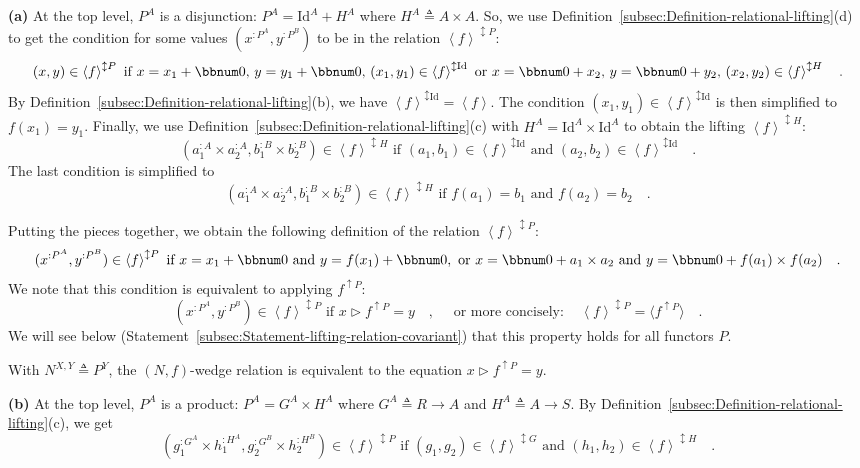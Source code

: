 \textbf{(a)} At the top level, $P^{A}$ is a disjunction: $P^{A}=\text{Id}^{A}+H^{A}$
where $H^{A}\triangleq A\times A$. So, we use Definition~\ref{subsec:Definition-relational-lifting}(d)
to get the condition for some values $(x^{:P^{A}},y^{:P^{B}})$ to
be in the relation $\left<f\right>^{\updownarrow P}$:
\[
(x,y)\in\left<f\right>^{\updownarrow P}\text{ if }x=x_{1}+\bbnum 0,\,y=y_{1}+\bbnum 0,\,(x_{1},y_{1})\in\left<f\right>^{\updownarrow\text{Id}}\text{ or }x=\bbnum 0+x_{2},\,y=\bbnum 0+y_{2},\,(x_{2},y_{2})\in\left<f\right>^{\updownarrow H}\quad.
\]
By Definition~\ref{subsec:Definition-relational-lifting}(b), we
have $\left<f\right>^{\updownarrow\text{Id}}=\left<f\right>$. The
condition $(x_{1},y_{1})\in\left<f\right>^{\updownarrow\text{Id}}$
is then simplified to $f(x_{1})=y_{1}$. Finally, we use Definition~\ref{subsec:Definition-relational-lifting}(c)
with $H^{A}=\text{Id}^{A}\times\text{Id}^{A}$ to obtain the lifting
$\left<f\right>^{\updownarrow H}$:
\[
(a_{1}^{:A}\times a_{2}^{:A},b_{1}^{:B}\times b_{2}^{:B})\in\left<f\right>^{\updownarrow H}\text{ if }(a_{1},b_{1})\in\left<f\right>^{\updownarrow\text{Id}}\text{ and }(a_{2},b_{2})\in\left<f\right>^{\updownarrow\text{Id}}\quad.
\]
The last condition is simplified to
\[
(a_{1}^{:A}\times a_{2}^{:A},b_{1}^{:B}\times b_{2}^{:B})\in\left<f\right>^{\updownarrow H}\text{ if }f(a_{1})=b_{1}\text{ and }f(a_{2})=b_{2}\quad.
\]

Putting the pieces together, we obtain the following definition of
the relation $\left<f\right>^{\updownarrow P}$:
\[
(x^{:P^{A}},y^{:P^{B}})\in\left<f\right>^{\updownarrow P}\text{ if }x=x_{1}+\bbnum 0\text{ and }y=f(x_{1})+\bbnum 0,\text{ or }x=\bbnum 0+a_{1}\times a_{2}\text{ and }y=\bbnum 0+f(a_{1})\times f(a_{2})\quad.
\]
We note that this condition is equivalent to applying $f^{\uparrow P}$:
\[
(x^{:P^{A}},y^{:P^{B}})\in\left<f\right>^{\updownarrow P}\text{ if }x\triangleright f^{\uparrow P}=y\quad,\quad\text{ or more concisely}:\quad\left<f\right>^{\updownarrow P}=\langle f^{\uparrow P}\rangle\quad.
\]
We will see below (Statement~\ref{subsec:Statement-lifting-relation-covariant})
that this property holds for all functors $P$.

With $N^{X,Y}\triangleq P^{Y}$, the $\left(N,f\right)$-wedge relation
is equivalent to the equation $x\triangleright f^{\uparrow P}=y$.

\textbf{(b)} At the top level, $P^{A}$ is a product: $P^{A}=G^{A}\times H^{A}$
where $G^{A}\triangleq R\rightarrow A$ and $H^{A}\triangleq A\rightarrow S$.
By Definition~\ref{subsec:Definition-relational-lifting}(c), we
get
\[
(g_{1}^{:G^{A}}\times h_{1}^{:H^{A}},g_{2}^{:G^{B}}\times h_{2}^{:H^{B}})\in\left<f\right>^{\updownarrow P}\text{ if }(g_{1},g_{2})\in\left<f\right>^{\updownarrow G}\text{ and }(h_{1},h_{2})\in\left<f\right>^{\updownarrow H}\quad.
\]

